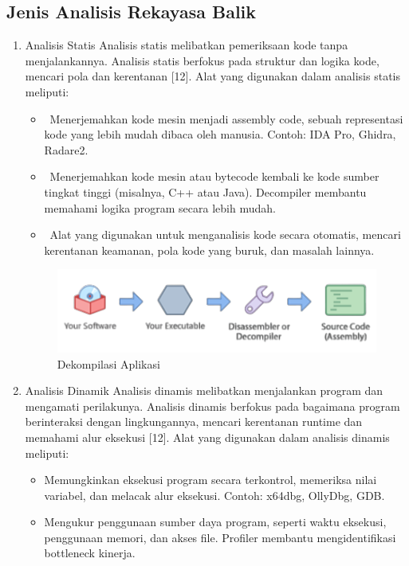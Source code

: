 \subsection{Jenis Analisis Rekayasa Balik}
\begin{enumerate}
	\item Analisis Statis
	      Analisis statis melibatkan pemeriksaan kode tanpa menjalankannya. Analisis statis berfokus pada struktur dan logika kode, mencari pola dan kerentanan [12]. Alat yang digunakan dalam analisis statis meliputi:
	      \begin{itemize}
		      \item {}  Menerjemahkan kode mesin menjadi assembly code, sebuah representasi kode yang lebih mudah dibaca oleh manusia. Contoh: IDA Pro, Ghidra, Radare2.
		      \item {}  Menerjemahkan kode mesin atau bytecode kembali ke kode sumber tingkat tinggi (misalnya, C++ atau Java). Decompiler membantu memahami logika program secara lebih mudah.
		      \item {}  Alat yang digunakan untuk menganalisis kode secara otomatis, mencari kerentanan keamanan, pola kode yang buruk, dan masalah lainnya.
	      \end{itemize}

	      \begin{figure}
		      \centering
		      \includegraphics[width=.75\textwidth]
		      {assets/pics/program_decompile.png}
		      \caption{Dekompilasi Aplikasi}
	      \end{figure}
	\item Analisis Dinamik
	      Analisis dinamis melibatkan menjalankan program dan mengamati perilakunya. Analisis dinamis berfokus pada bagaimana program berinteraksi dengan lingkungannya, mencari kerentanan runtime dan memahami alur eksekusi [12]. Alat yang digunakan dalam analisis dinamis meliputi:
	      \begin{itemize}
		      \item {} Memungkinkan eksekusi program secara terkontrol, memeriksa nilai variabel, dan melacak alur eksekusi. Contoh: x64dbg, OllyDbg, GDB.
		      \item {} Mengukur penggunaan sumber daya program, seperti waktu eksekusi, penggunaan memori, dan akses file. Profiler membantu mengidentifikasi bottleneck kinerja.
	      \end{itemize}
\end{enumerate}

